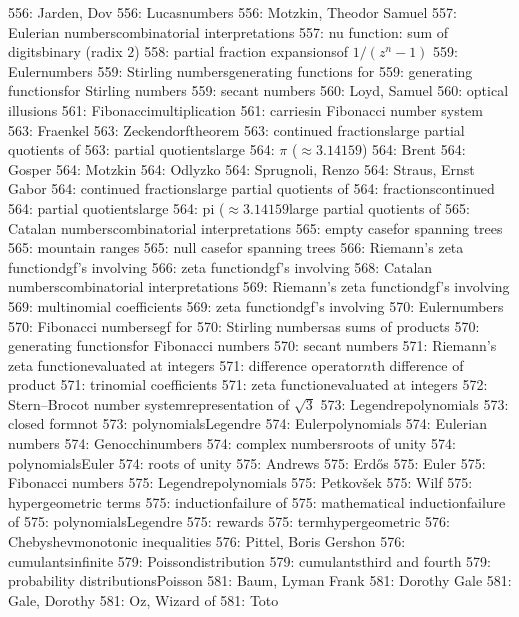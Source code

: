 556: Jarden, Dov
556: Lucas\sub numbers
556: Motzkin, Theodor Samuel
557: Eulerian numbers\sub combinatorial interpretations
557: nu function: sum of digits\sub binary (radix $2$)
558: partial fraction expansions\sub of $1/(z^n-1)$
559: Euler\sub numbers
559: Stirling numbers\sub generating functions for
559: generating functions\sub for Stirling numbers
559: secant numbers
560: Loyd, Samuel
560: optical illusions
561: Fibonacci\sub multiplication
561: carries\sub in Fibonacci number system
563: Fraenkel
563: Zeckendorf\sub theorem
563: continued fractions\sub large partial quotients of
563: partial quotients\sub large
564: $\pi$ ($\approx3.14159$)
564: Brent
564: Gosper
564: Motzkin
564: Odlyzko
564: Sprugnoli, Renzo
564: Straus, Ernst Gabor
564: continued fractions\sub large partial quotients of
564: fractions\sub continued
564: partial quotients\sub large
564: pi ($\approx3.14159$\sub large partial quotients of
565: Catalan numbers\sub combinatorial interpretations
565: empty case\sub for spanning trees
565: mountain ranges
565: null case\sub for spanning trees
566: Riemann's zeta function\sub dgf's involving
566: zeta function\sub dgf's involving
568: Catalan numbers\sub combinatorial interpretations
569: Riemann's zeta function\sub dgf's involving
569: multinomial coefficients
569: zeta function\sub dgf's involving
570: Euler\sub numbers
570: Fibonacci numbers\sub egf for
570: Stirling numbers\sub as sums of products
570: generating functions\sub for Fibonacci numbers
570: secant numbers
571: Riemann's zeta function\sub evaluated at integers
571: difference operator\sub $n$th difference of product
571: trinomial coefficients
571: zeta function\sub evaluated at integers
572: Stern--Brocot number system\sub representation of $\sqrt3$
573: Legendre\sub polynomials
573: closed form\sub not
573: polynomials\sub Legendre
574: Euler\sub polynomials
574: Eulerian numbers
574: Genocchi\sub numbers
574: complex numbers\sub roots of unity
574: polynomials\sub Euler
574: roots of unity
575: Andrews
575: Erd\H os
575: Euler
575: Fibonacci numbers
575: Legendre\sub polynomials
575: Petkov\v{s}ek
575: Wilf
575: hypergeometric terms
575: induction\sub failure of
575: mathematical induction\sub failure of
575: polynomials\sub Legendre
575: rewards
575: term\sub hypergeometric
576: Chebyshev\sub monotonic inequalities
576: Pittel, Boris Gershon
576: cumulants\sub infinite
579: Poisson\sub distribution
579: cumulants\sub third and fourth
579: probability distributions\sub Poisson
581: Baum, Lyman Frank
581: Dorothy Gale
581: Gale, Dorothy
581: Oz, Wizard of
581: Toto
